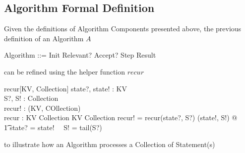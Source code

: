 \documentclass[../main.tex]{subfiles}
\begin{document}
\subsection{Algorithm Formal Definition}
Given the definitions of Algorithm Components presented above, the previous definition of an Algorithm $A$
\begin{zed}
  Algorithm ::= Init \semi Relevant? \semi Accept? \semi Step \semi Result
\end{zed}
can be refined using the helper function $recur$
\begin{schema}{recur[KV, Collection]}
  state?, state! : KV \\
  S?, S! : Collection \\
  recur! : (KV, COllection) \\
  recur : KV \cross Collection \fun KV \cross Collection
  \where
  recur! = recur(state?, S?) \implies (state!, S!) @ \\
  \t1 state? = state! ~\land ~S! = tail(S?)
\end{schema}
to illustrate how an Algorithm processes a Collection of Statement(s)
\end{document}

